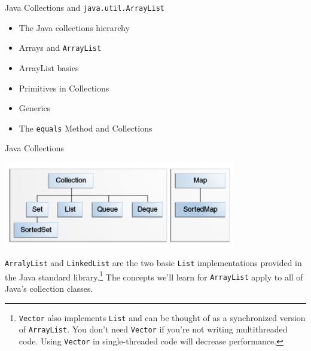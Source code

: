 \documentclass{beamer}
\author[Chris Simpkins] 
{Christopher Simpkins \\\texttt{chris.simpkins@gatech.edu}}
\institute[Georgia Tech] %
\date[CS 1331]{}
\begin{document}
\begin{frame}
  \titlepage
\end{frame}

\begin{frame}[fragile]{Java Collections and {\tt java.util.ArrayList}}

\begin{itemize}
\item The Java collections hierarchy
\item Arrays and {\tt ArrayList}
\item ArrayList basics
\item Primitives in Collections
\item Generics
\item The {\tt equals} Method and Collections
\end{itemize}


\end{frame}

\begin{frame}[fragile]{Java Collections}

\begin{center}
\includegraphics[width=4in]{colls-coreInterfaces.png}
\end{center}

{\tt ArralyList} and {\tt LinkedList} are the two basic {\tt List} implementations provided in the Java standard library.\footnote{{\tt Vector} also implements {\tt List} and can be thought of as a synchronized version of {\tt ArrayList}.  You don't need {\tt Vector} if you're not writing multithreaded code.  Using {\tt Vector} in single-threaded code will decrease performance.}  The concepts we'll learn for {\tt ArrayList} apply to all of Java's collection classes.

\end{frame}
\end{document}
